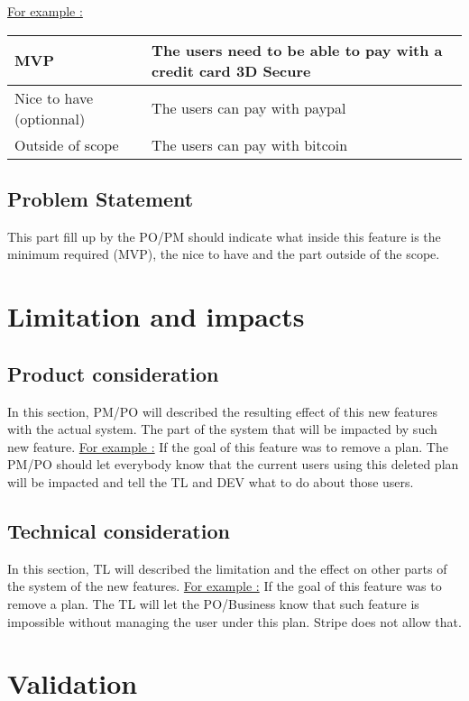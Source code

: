 \documentclass[a4paper,article,oneside]{memoir}
\begin{document}
        		\underline{For example :}

\begin{tabularx}{0.8\textwidth} { 
  | >{\raggedright\arraybackslash}X 
  | >{\raggedright\arraybackslash}X | }
 \hline
 MVP & The users need to be able to pay with a credit card 3D Secure \\
 \hline
 Nice to have (optionnal)  & The users can pay with paypal  \\
\hline
 Outside of scope  & The users can pay with bitcoin  \\
\hline
\end{tabularx}

        \section{Problem Statement}
                    This part fill up by the \gls{PO}/\gls{PM} should indicate what inside this feature is the minimum required (MVP), the nice to have and the part outside of the scope.
     \chapter{Limitation and impacts}
        \section{Product consideration}
        In this section, \gls{PM}/\gls{PO} will described the resulting effect of this new features with the actual system. The part of the system that will be impacted by such new feature.
        \underline{For example :}
        If the goal of this feature was to remove a plan. The \gls{PM}/\gls{PO} should let everybody know that the current users using this deleted plan will be impacted and tell the \gls{TL} and \gls{DEV} what to do about those users. 
        \section{Technical consideration}
        In this section, \gls{TL} will described the limitation and the effect on other parts of the system of the new features.    
        \underline{For example :}
        If the goal of this feature was to remove a plan. The \gls{TL} will let the \gls{PO}/\gls{Business} know that such feature is impossible without managing the user under this plan. Stripe does not allow that. 
      \chapter{Validation}
\end{document}
